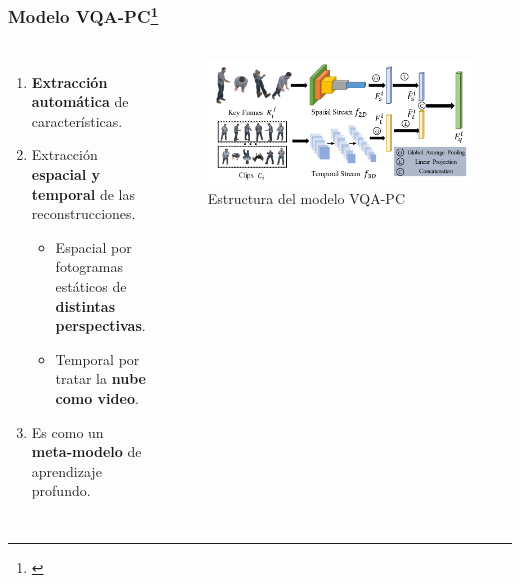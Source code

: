 \begin{frame}
  \frametitle{Modelo VQA-PC\footnote[frame]{\cite{VQA-PC}}}
  \begin{columns}
    \begin{enumerate}
      \item \textbf{Extracción automática} de características.
      \item Extracción \textbf{espacial y temporal} de las reconstrucciones.
        \begin{itemize}
          \item Espacial por fotogramas estáticos de \textbf{distintas perspectivas}.
          \item Temporal por tratar la \textbf{nube como video}.
        \end{itemize}
      \item Es como un \textbf{meta-modelo} de aprendizaje profundo. 
    \end{enumerate}
    \begin{figure}
      \begin{center}
        \includegraphics[width=\textwidth]{imagenes/chapter3/PipelineCompleto}
      \end{center}
      \caption{Estructura del modelo VQA-PC}
    \end{figure}
  \end{columns}
\end{frame}

